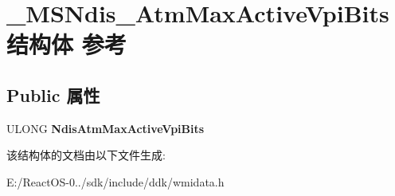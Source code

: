 \hypertarget{struct___m_s_ndis___atm_max_active_vpi_bits}{}\section{\+\_\+\+M\+S\+Ndis\+\_\+\+Atm\+Max\+Active\+Vpi\+Bits结构体 参考}
\label{struct___m_s_ndis___atm_max_active_vpi_bits}
\subsection*{Public 属性}
\begin{DoxyCompactItemize}
\item 
\mbox{\label{struct___m_s_ndis___atm_max_active_vpi_bits_addabe0a0300b91924b5f35d04f2decdc}} 
U\+L\+O\+NG {\bfseries Ndis\+Atm\+Max\+Active\+Vpi\+Bits}
\end{DoxyCompactItemize}


该结构体的文档由以下文件生成\+:\begin{DoxyCompactItemize}
\item 
E\+:/\+React\+O\+S-\/0../sdk/include/ddk/wmidata.\+h\end{DoxyCompactItemize}
